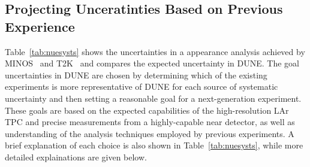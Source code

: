 
\subsection{Projecting Unceratinties Based on Previous Experience}

Table~\ref{tab:nuesysts} shows the uncertainties in a \nue appearance analysis achieved by MINOS~\cite{Adamson:2013ue}
and T2K~\cite{Abe:2015awa} and compares the expected uncertainty in
DUNE. The goal uncertainties in DUNE are chosen by determining which
of the existing experiments is more representative of DUNE for each source
of systematic uncertainty and then setting a reasonable goal for a next-generation
experiment. These goals are based on the expected capabilities of the high-resolution
LAr TPC and  precise measurements from a highly-capable near detector, as well as
understanding of the analysis techniques employed by previous experiments.
A brief explanation of each choice is also shown in Table~\ref{tab:nuesysts},
while more detailed explainations are given below.


